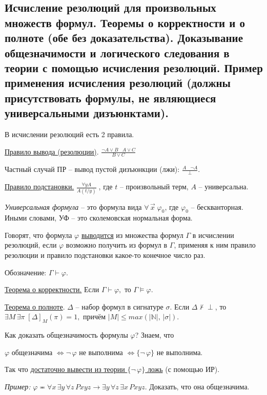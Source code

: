 \documentclass[a4paper, fleqn]{article}
\begin{document}
    \subsection{Исчисление резолюций для произвольных множеств формул. Теоремы о корректности и о полноте (обе без доказательства). Доказывание общезначимости и логического следования в теории с помощью исчисления резолюций. Пример применения исчисления резолюций (должны присутствовать формулы, не являющиеся универсальными дизъюнктами).}
    
    В исчислении резолюций есть 2 правила.
    
    \underline{Правило вывода (резолюции)}. $\boxed{\frac{\neg A \lor B \; \; \; A \lor C}{B \lor C} } $
    
    Частный случай ПР -- вывод пустой дизъюнкции (лжи): $\frac{A \; \; \; \neg A}{\perp}.$
    
    \underline{Правило подстановки.} $\boxed{\frac{\forall y A}{A(t/y)}} \; $, где $t$ -- произвольный терм, $A$ -- универсальна.
    
    \textit{Универсальная формула} -- это формула вида $\forall \, \overset{\to}{x} \; \varphi_0$, где $\varphi_0$ -- бескванторная. Иными словами, УФ -- это сколемовская нормальная форма.
    
    Говорят, что формула $\varphi$ \underline{выводится} из множества  формул $\Gamma$ в исчислении резолюций, если $\varphi$ возможно получить из формул в $\Gamma$, применяя к ним правило резолюции и правило подстановки какое-то конечное число раз.
    
    Обозначение: $\Gamma \vdash \varphi.$
    
    \underline{Теорема о корректности.} Если $\Gamma \vdash \varphi,$ то $\Gamma \vDash \varphi.$
    
    \underline{Теорема о полноте}. $\Delta$ -- набор формул в сигнатуре $\sigma$. Если $\Delta \nvdash \perp$, то $\exists M \, \exists \pi \; [\Delta]_M (\pi) = 1,$ причём $|M| \leq max(|\mathbb{N}|, \, | \sigma|). $
    
    Как доказать общезначимость формулы $\varphi$? Знаем, что 
    
    $\varphi$ общезначима $\iff \neg \, \varphi$ не выполнима $\iff \{ \neg \, \varphi\}$ не выполнима. 
    
    Так что \underline{достаточно вывести из теории $\{ \neg \, \varphi\}$ ложь} (с помощью ИР).
    
    \textit{Пример:} $\varphi \eqcirc \forall x \, \exists y \, \forall z \, Pxyz \to \exists y \, \forall z \, \exists x  \, Pxyz.$ Доказать, что она общезначима.
    
\end{document}
